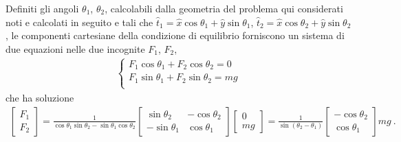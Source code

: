 \documentclass[letterpaper,10pt,italian]{jupyterBook}
\begin{document}
\sphinxAtStartPar
Definiti gli angoli \(\theta_1\), \(\theta_2\), calcolabili dalla geometria del problema \sphinxhyphen{} qui considerati noti e calcolati in seguito \sphinxhyphen{} e tali che \(\hat{t}_1 = \hat{x} \cos \theta_1 + \hat{y}  \sin \theta_1\), \(\hat{t}_2 = \hat{x} \cos \theta_2 + \hat{y} \sin \theta_2\), le componenti cartesiane della condizione di equilibrio forniscono un sistema di due equazioni nelle due incognite \(F_1\), \(F_2\),
\begin{equation*}
\begin{split}\begin{cases} 
  F_1 \cos \theta_1 + F_2 \cos \theta_2 = 0 \\
  F_1 \sin \theta_1 + F_2 \sin \theta_2 = m g \\
\end{cases}\end{split}
\end{equation*}
\sphinxAtStartPar
che ha soluzione
\begin{equation*}
\begin{split}
  \begin{bmatrix} F_1 \\ F_2 \end{bmatrix} 
    = \frac{1}{\cos \theta_1 \sin \theta_2 - \sin \theta_1 \cos \theta_2}
    \begin{bmatrix} \sin \theta_2 & - \cos \theta_2 \\ -\sin \theta_1 & \cos \theta_1 \end{bmatrix} \begin{bmatrix} 0 \\ m g \end{bmatrix} 
    = \frac{1}{\sin(\theta_2 - \theta_1)} \begin{bmatrix} - \cos \theta_2 \\ \cos \theta_1 \end{bmatrix} m g  \ .
\end{split}
\end{equation*}
\sphinxAtStartPar
{} 
\end{document}
